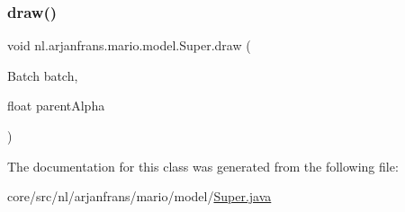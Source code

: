 \subsubsection{\texorpdfstring{draw()}{draw()}}
{\footnotesize\ttfamily void nl.\+arjanfrans.\+mario.\+model.\+Super.\+draw (\begin{DoxyParamCaption}\item[{Batch}]{batch,  }\item[{float}]{parent\+Alpha }\end{DoxyParamCaption})}







The documentation for this class was generated from the following file\+:\begin{DoxyCompactItemize}
\item 
core/src/nl/arjanfrans/mario/model/\hyperlink{Super_8java}{Super.\+java}\end{DoxyCompactItemize}

